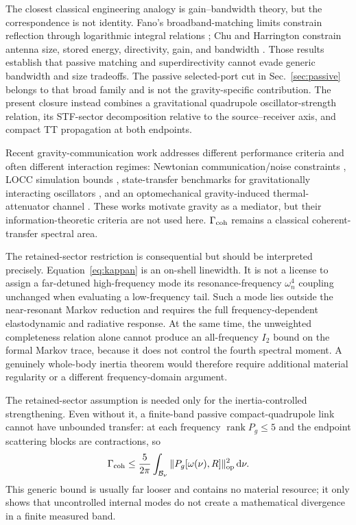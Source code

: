 The closest classical engineering analogy is gain--bandwidth theory, but the correspondence is not identity. Fano's broadband-matching limits constrain reflection through logarithmic integral relations \cite{Fano1950}; Chu and Harrington constrain antenna size, stored energy, directivity, gain, and bandwidth \cite{Chu1948,Harrington1960}. Those results establish that passive matching and superdirectivity cannot evade generic bandwidth and size tradeoffs. The passive selected-port cut in Sec.~\ref{sec:passive} belongs to that broad family and is not the gravity-specific contribution. The present closure instead combines a gravitational quadrupole oscillator-strength relation, its STF-sector decomposition relative to the source--receiver axis, and compact TT propagation at both endpoints.

Recent gravity-communication work addresses different performance criteria and often different interaction regimes: Newtonian communication/noise constraints \cite{KafriMilburnTaylor2015}, LOCC simulation bounds \cite{LamiPedernalesPlenio2024}, state-transfer benchmarks for gravitationally interacting oscillators \cite{ToccaceloAndersenBrask2025}, and an optomechanical gravity-induced thermal-attenuator channel \cite{MariZippilliVitali2026}. These works motivate gravity as a mediator, but their information-theoretic criteria are not used here. $\Gamma_{\rm coh}$ remains a classical coherent-transfer spectral area.

The retained-sector restriction is consequential but should be interpreted precisely. Equation~\eqref{eq:kappan} is an on-shell linewidth. It is not a license to assign a far-detuned high-frequency mode its resonance-frequency $\omega_n^4$ coupling unchanged when evaluating a low-frequency tail. Such a mode lies outside the near-resonant Markov reduction and requires the full frequency-dependent elastodynamic and radiative response. At the same time, the unweighted completeness relation alone cannot produce an all-frequency $I_2$ bound on the formal Markov trace, because it does not control the fourth spectral moment. A genuinely whole-body inertia theorem would therefore require additional material regularity or a different frequency-domain argument.

The retained-sector assumption is needed only for the inertia-controlled strengthening. Even without it, a finite-band passive compact-quadrupole link cannot have unbounded transfer: at each frequency $\operatorname{rank}P_g\le5$ and the endpoint scattering blocks are contractions, so
\begin{equation}
\Gamma_{\rm coh}
\le
\frac{5}{2\pi}\int_{\mathcal B_\nu}
\|P_g[\omega(\nu),R]\|_{\mathrm{op}}^2\,\mathrm d\nu .
\label{eq:genericbandbound}
\end{equation}
This generic bound is usually far looser and contains no material resource; it only shows that uncontrolled internal modes do not create a mathematical divergence in a finite measured band.

